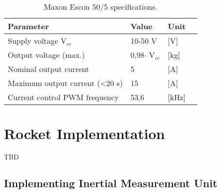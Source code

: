 \begin{table}[htbp]
	\centering
	\begin{tabular}{llll}
	\hline
	Parameter & Value & Unit \\ \hline
	Supply voltage V$_{cc}$& 10-50 V & {[}V{]} \\
	Output voltage (max.) & 0,98$\cdot$ V$_{cc}$& {[}kg{]} \\
	Nominal output current & 5 & {[}A{]} \\
	Maximum output current (<20 s) & 15 & {[}A{]}\\
	Current control PWM frequency & 53,6 & {[}kHz{]}
	\end{tabular}
\caption{Maxon Escon 50/5 specifications.}
\label{MaxonSpecifications}
\end{table}



\section{Rocket Implementation}
TBD

\subsection{Implementing Inertial Measurement Unit}